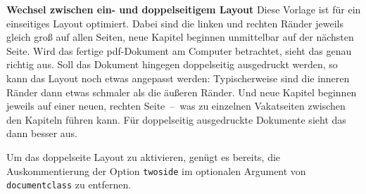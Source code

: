\textbf{Wechsel zwischen ein- und doppelseitigem Layout}
Diese Vorlage ist für ein einseitiges Layout optimiert. Dabei sind die linken 
und rechten Ränder jeweils gleich groß auf allen Seiten, neue Kapitel beginnen 
unmittelbar auf
der nächsten Seite. Wird das fertige pdf-Dokument am Computer betrachtet,
sieht das genau richtig aus. Soll das Dokument hingegen doppelseitig 
ausgedruckt werden, so kann das Layout noch etwas angepasst werden: 
Typischerweise sind die inneren Ränder dann etwas schmaler als die äußeren 
Ränder. Und neue Kapitel beginnen jeweils auf einer neuen, rechten
Seite~--~was zu einzelnen Vakatseiten zwischen den Kapiteln führen kann.
Für doppelseitig ausgedruckte Dokumente sieht das dann besser aus.

Um das doppelseite Layout zu aktivieren, genügt es bereits, die 
Auskommentierung der Option \texttt{twoside} im optionalen Argument von 
\texttt{\tb documentclass} zu entfernen.


